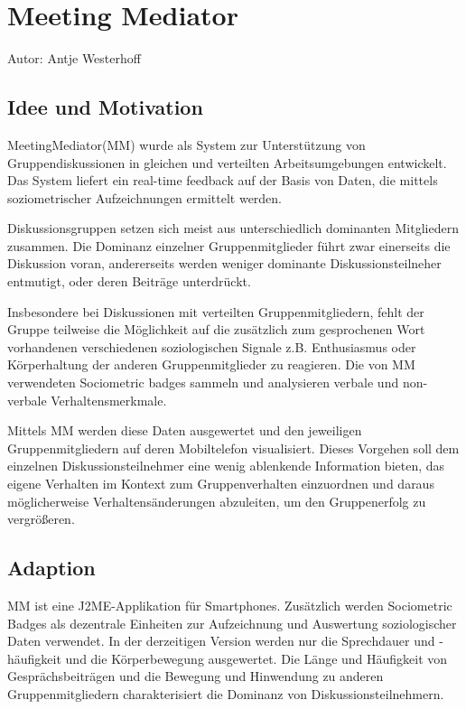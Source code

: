 \section{Meeting Mediator}
Autor: Antje Westerhoff

\subsection{Idee und Motivation}
MeetingMediator(MM) wurde als System zur Unterstützung von Gruppendiskussionen
in gleichen und verteilten Arbeitsumgebungen entwickelt. Das System liefert ein
real-time feedback auf der Basis von Daten, die mittels soziometrischer
Aufzeichnungen ermittelt werden.

Diskussionsgruppen setzen sich meist aus unterschiedlich dominanten Mitgliedern
zusammen. Die Dominanz einzelner Gruppenmitglieder führt zwar einerseits die
Diskussion voran, andererseits werden weniger dominante Diskussionsteilneher 
entmutigt, oder deren Beiträge unterdrückt.

Insbesondere bei Diskussionen mit verteilten Gruppenmitgliedern, fehlt der
Gruppe teilweise die Möglichkeit auf die zusätzlich zum gesprochenen Wort
vorhandenen verschiedenen soziologischen Signale z.B. Enthusiasmus oder
Körperhaltung der anderen Gruppenmitglieder zu reagieren.
Die von MM verwendeten Sociometric badges sammeln und analysieren
verbale und non-verbale Verhaltensmerkmale.

Mittels MM werden diese Daten ausgewertet und den jeweiligen Gruppenmitgliedern
auf deren Mobiltelefon visualisiert. Dieses Vorgehen soll dem einzelnen
Diskussionsteilnehmer eine wenig ablenkende Information bieten, das eigene
Verhalten im Kontext zum Gruppenverhalten einzuordnen und daraus möglicherweise
Verhaltensänderungen abzuleiten, um den Gruppenerfolg zu vergrößeren.

\subsection{Adaption}

MM ist eine J2ME-Applikation für Smartphones. Zusätzlich werden Sociometric
Badges als dezentrale Einheiten zur Aufzeichnung und Auswertung
soziologischer Daten verwendet. In der derzeitigen Version werden nur die
Sprechdauer und -häufigkeit und die Körperbewegung ausgewertet.
Die Länge und Häufigkeit von Gesprächsbeiträgen und die Bewegung und Hinwendung
zu anderen Gruppenmitgliedern charakterisiert die Dominanz von Diskussionsteilnehmern.

